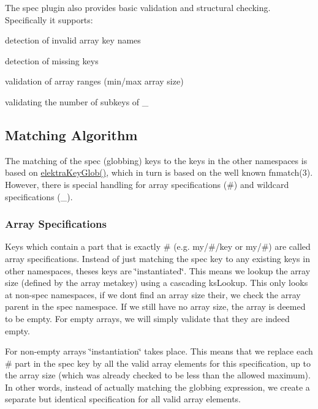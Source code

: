The spec plugin also provides basic validation and structural checking. Specifically it supports\+:


\begin{DoxyItemize}
\item detection of invalid array key names
\item detection of missing keys
\item validation of array ranges (min/max array size)
\item validating the number of subkeys of {\ttfamily \+\_\+}
\end{DoxyItemize}

\subsection*{Matching Algorithm}

The matching of the spec (globbing) keys to the keys in the other namespaces is based on {\ttfamily \hyperlink{globbing_8c_ad7700821df72fc0fc3bfc336e4368d29}{elektra\+Key\+Glob()}}, which in turn is based on the well known {\ttfamily fnmatch(3)}. However, there is special handling for array specifications ({\ttfamily \#}) and wildcard specifications ({\ttfamily \+\_\+}).

\subsubsection*{Array Specifications}

Keys which contain a part that is exactly {\ttfamily \#} (e.\+g. {\ttfamily my/\#/key} or {\ttfamily my/\#}) are called array specifications. Instead of just matching the spec key to any existing keys in other namespaces, theses keys are \char`\"{}instantiated\char`\"{}. This means we lookup the array size (defined by the {\ttfamily array} metakey) using a cascading {\ttfamily ks\+Lookup}. This only looks at non-\/spec namespaces, if we don\textquotesingle{}t find an array size their, we check the array parent in the spec namespace. If we still have no array size, the array is deemed to be empty. For empty arrays, we will simply validate that they are indeed empty.

For non-\/empty arrays \char`\"{}instantiation\char`\"{} takes place. This means that we replace each {\ttfamily \#} part in the spec key by all the valid array elements for this specification, up to the array size (which was already checked to be less than the allowed maximum). In other words, instead of actually matching the globbing expression, we create a separate but identical specification for all valid array elements.

